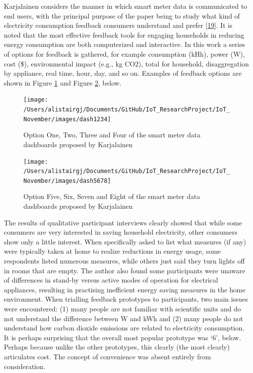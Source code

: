 \documentclass[11pt,]{article}
\begin{document}
Karjalainen considers the manner in which smart meter data is
communicated to end users, with the principal purpose of the paper being
to study what kind of electricity consumption feedback consumers
understand and prefer
{[}\protect\hyperlink{ref-karjalainenConsumerPreferencesFeedback2011}{19}{]}.
It is noted that the most effective feedback tools for engaging
households in reducing energy consumption are both computerized and
interactive. In this work a series of options for feedback is gathered,
for example consumption (kHh), power (W), cost (\$), environmental
impact (e.g., kg CO2), total for household, disaggregation by appliance,
real time, hour, day, and so on. Examples of feedback options are shown
in Figure \ref{fig:fb1} and Figure \ref{fig:fb2}, below.

\begin{figure}[H]

{\centering \texttt{[image: /Users/alistairgj/Documents/GitHub/IoT\_ResearchProject/IoT\_November/images/dash1234]} 

}

\caption{Option One, Two, Three and Four of the smart meter data dashboards proposed by Karjalainen}\label{fig:fb1}
\end{figure}

\begin{figure}[H]

{\centering \texttt{[image: /Users/alistairgj/Documents/GitHub/IoT\_ResearchProject/IoT\_November/images/dash5678]} 

}

\caption{Option Five, Six, Seven and Eight of the smart meter data dashboards proposed by Karjalainen}\label{fig:fb2}
\end{figure}

The results of qualitative participant interviews clearly showed that
while some consumers are very interested in saving household
electricity, other consumers show only a little interest. When
specifically asked to list what measures (if any) were typically taken
at home to realize reductions in energy usage, some respondents listed
numerous measures, while others just said they turn lights off in rooms
that are empty. The author also found some participants were unaware of
differences in stand-by versus active modes of operation for electrical
appliances, resulting in practising inefficient energy saving measures
in the home environment. When trialling feedback prototypes to
participants, two main issues were encountered: (1) many people are not
familiar with scientific units and do not understand the difference
between W and kWh and (2) many people do not understand how carbon
dioxide emissions are related to electricity consumption. It is perhaps
surprising that the overall most popular prototype was `6', below.
Perhaps because unlike the other prototypes, this clearly (the most
clearly) articulates cost. The concept of convenience was absent
entirely from consideration.
\end{document}
